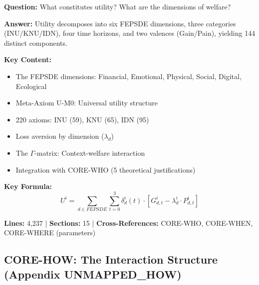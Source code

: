 \begin{tcolorbox}[colback=gray!5!white, colframe=gray!75!black]
\textbf{Question:} What constitutes utility? What are the dimensions of welfare?

\textbf{Answer:} Utility decomposes into six FEPSDE dimensions, three categories 
(INU/KNU/IDN), four time horizons, and two valences (Gain/Pain), yielding 
144 distinct components.

\textbf{Key Content:}
\begin{itemize}[nosep]
\item The FEPSDE dimensions: Financial, Emotional, Physical, Social, Digital, Ecological
\item Meta-Axiom U-M0: Universal utility structure
\item 220 axioms: INU (59), KNU (65), IDN (95)
\item Loss aversion by dimension ($\lambda_d$)
\item The $\Gamma$-matrix: Context-welfare interaction
\item Integration with CORE-WHO (5 theoretical justifications)
\end{itemize}

\textbf{Key Formula:}
\begin{equation}
U^{i} = \sum_{d \in FEPSDE} \sum_{t=0}^{3} \delta^{i}_{d}(t) \cdot 
\left[ G^{i}_{d,t} - \lambda^{i}_{d} \cdot P^{i}_{d,t} \right]
\end{equation}

\textbf{Lines:} 4,237 | \textbf{Sections:} 15 | \textbf{Cross-References:} CORE-WHO, CORE-WHEN, CORE-WHERE (parameters)
\end{tcolorbox}

\subsection{CORE-HOW: The Interaction Structure (Appendix UNMAPPED_HOW)}

